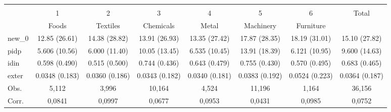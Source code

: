 \begin{tabular}{l*{7}{c}}
\hline\hline
                    &\multicolumn{7}{c}{}                                                                      \\
                    &           1&           2&           3&           4&           5&           6&       Total\\
 &Foods &Textiles &Chemicals &Metal &Machinery &Furniture\\\midrule
new\_0               &12.85 (26.61)&14.38 (28.82)&13.91 (26.93)&13.35 (27.42)&17.87 (28.35)&18.19 (31.01)&15.10 (27.82)\\
[1em]
pidp                &5.606 (10.56)&6.000 (11.40)&10.05 (13.45)&6.535 (10.45)&13.91 (18.39)&6.121 (10.95)&9.600 (14.63)\\
[1em]
idin                &0.598 (0.490)&0.515 (0.500)&0.744 (0.436)&0.643 (0.479)&0.755 (0.430)&0.570 (0.495)&0.683 (0.465)\\
[1em]
exter               &0.0348 (0.183)&0.0360 (0.186)&0.0343 (0.182)&0.0340 (0.181)&0.0383 (0.192)&0.0524 (0.223)&0.0364 (0.187)\\
\midrule Obs.&5,112&3,996&10,164&4,524&11,196&1,164&36,156\\
\midrule Corr.&0,0841&0,0997&0,0677&0,0953&0,0431&0,0985&0,0752\\\bottomrule\end{tabular}\\
